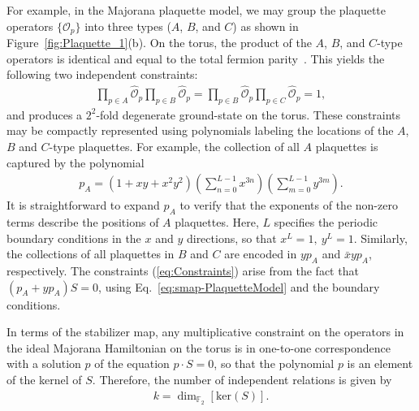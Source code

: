 \documentclass[aps,twocolumn,preprintnumbers,floatfix,showpacs,prx]{revtex4-1}
\begin{document}
For example, in the Majorana plaquette model, 
we may group the plaquette operators $\{\mathcal{O}_{p}\}$ 
into three types ($A$, $B$, and $C$) as shown in Figure~\ref{fig:Plaquette_1}(b).
On the torus, the product of the $A$, $B$, and $C$-type operators is identical 
and equal to the total fermion parity~\cite{vijay}.
This yields the following two independent constraints:
\begin{align}\label{eq:Constraints}
\prod_{p\in A}\hat{\mathcal{O}}_{p} \prod_{p\in B}\hat{\mathcal{O}}_{p} 
= \prod_{p\in B}\hat{\mathcal{O}}_{p} \prod_{p\in C}\hat{\mathcal{O}}_{p} = 1,
\end{align}
and produces a $2^2$-fold degenerate ground-state on the torus.  These constraints may be compactly represented using polynomials labeling the locations of the $A$, $B$ and $C$-type plaquettes. 
For example, the collection of all $A$ plaquettes is captured by the polynomial
\begin{align}
 p_A = (1+xy+x^2 y^2)\left( \sum_{n=0}^{L-1} x^{3n} \right)\left( \sum_{m=0}^{L-1} y^{3m} \right).
\end{align}
It is straightforward to expand $p_A$ to verify that the exponents of the non-zero terms describe the positions of $A$ plaquettes.
Here, $L$ specifies the periodic boundary conditions in the $x$ and $y$ directions, so that $x^L=1, ~y^L=1$.
Similarly, the collections of all plaquettes in $B$ and $C$ are encoded in $y p_A$ and $\bar x y p_A$, respectively.
The constraints (\ref{eq:Constraints}) arise from the fact that $(p_A+y p_A) S = 0$, using Eq.~\eqref{eq:smap-PlaquetteModel} and the boundary conditions.

In terms of the stabilizer map, any multiplicative constraint on the operators in the ideal Majorana Hamiltonian on the torus is in one-to-one correspondence with a solution $p$
of the equation $p \cdot S = 0$, so that the polynomial $p$ is an element of the kernel of $S$.
Therefore, the number of independent relations is given by
\begin{align}\label{eq:Degen}
k = \dim_{\mathbb{F}_{2}}[\mathrm{ker}(S)].
\end{align}
\end{document}
